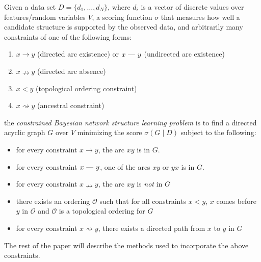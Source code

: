 \documentclass[twoside,11pt]{article}
\begin{document}
\begin{definition}

Given a data set $D = \{d_1, \ldots, d_N\}$, where $d_i$
is a vector of discrete values over features/random variables
$\mathit{V}$, a scoring function $\sigma$ that measures how
well a candidate structure is supported by the observed data,
and arbitrarily many constraints of one of the following forms:

\begin{enumerate}

\item $x \rightarrow y$ (directed arc existence) or  $x \text{ \textemdash \  } y$ (undirected arc existence)
\item $x \nrightarrow y$ (directed arc absence)
\item $x < y$ (topological ordering constraint)
\item $x \rightsquigarrow y$ (ancestral constraint)

\end{enumerate}

the \emph{constrained Bayesian network structure learning problem} is to
find a directed acyclic graph $\mathit{G}$ over $\mathit{V}$ minimizing the score $\sigma( \mathit{G} \mid D )$ subject to
the following:

\begin{itemize}

\item for every constraint $x \rightarrow y$, the arc $xy$ is in $G$.
\item for every constraint $x \text{ \textemdash \  } y$, one of the arcs $xy$ or $yx$ is in $G$.
\item for every constraint $x \nrightarrow y$, the arc $xy$ is \emph{not} in $G$
\item there exists an ordering $\mathcal{O}$ such that for all constraints $x < y$, $x$ comes before $y$ in $\mathcal{O}$ and $\mathcal{O}$ is a
	topological ordering for $G$
\item for every constraint $x \rightsquigarrow y$, there exists a directed path from $x$ to $y$ in $G$

\end{itemize}
\end{definition}


\medskip
The rest of the paper will describe the methods used to incorporate the above constraints. 


%
%
\end{document}
